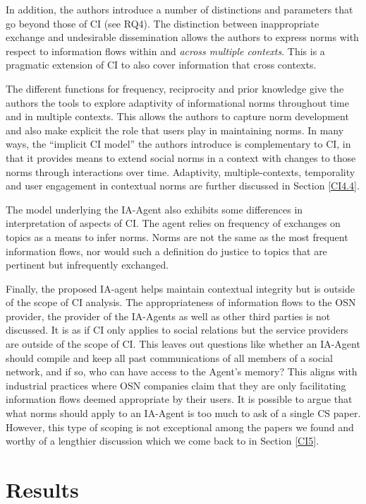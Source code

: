 \documentclass[../thesis.tex]{subfiles}
\begin{document}
In addition, the authors introduce a number of distinctions and
parameters that go beyond those of CI (see RQ4). The distinction between
inappropriate exchange and undesirable dissemination allows the authors
to express norms with respect to information flows within and
\textit{across multiple contexts}. This is a pragmatic extension of CI
to also cover information that cross contexts. 

The different functions for frequency, reciprocity and prior knowledge
give the authors the tools to explore adaptivity of informational norms
throughout time and in multiple contexts. This allows the authors to
capture norm development and also make explicit the role that users
play in maintaining norms. In many ways, the
``implicit CI model'' the authors
introduce is complementary to CI, in that it provides means to extend
social norms in a context with changes to those norms through
interactions over time. Adaptivity, multiple-contexts, temporality and
user engagement in contextual norms are further discussed in Section
\ref{CI4.4}.

The model underlying the IA-Agent also exhibits some differences in
interpretation of aspects of CI. The agent relies on frequency of
exchanges on topics as a means to infer norms. Norms are not the same
as the most frequent information flows, nor would such a definition do
justice to topics that are pertinent but infrequently exchanged. 

Finally, the proposed IA-agent helps maintain contextual integrity but
is outside of the scope of CI analysis. The appropriateness of
information flows to the OSN provider, the provider of the IA-Agents as
well as other third parties is not discussed. It is as if CI only
applies to social relations but the service providers are outside of
the scope of CI. This leaves out questions like whether an IA-Agent
should compile and keep all past communications of all members of a
social network, and if so, who can have access to the
Agent's memory? This aligns with industrial practices
where OSN companies claim that they are only facilitating information
flows deemed appropriate by their users. It is possible to argue that
what norms should apply to an IA-Agent is too much to ask of a single
CS paper. However, this type of scoping is not exceptional among the
papers we found and worthy of a lengthier discussion which we come back
to in Section \ref{CI5}.

\section{Results}
\label{CI4} 
\end{document}
